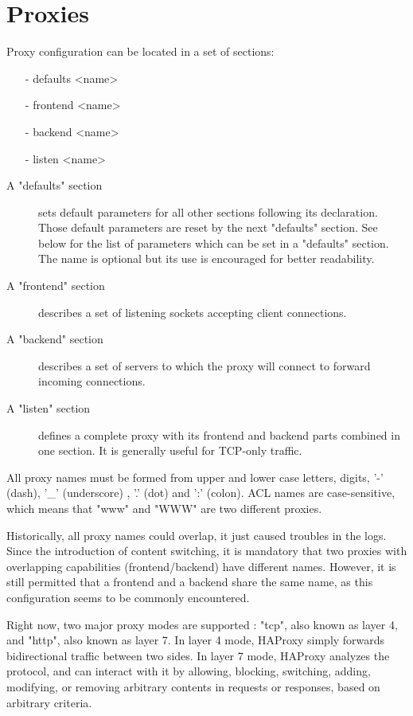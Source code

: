 \chapter{Proxies}

Proxy configuration can be located in a set of sections:
\begin{itemize}
\item[-] defaults <name>
\item[-] frontend <name>
\item[-] backend  <name>
\item[-] listen   <name>
\end{itemize}

\begin{description}
\item[A "defaults" section] sets default parameters for all other sections following
its declaration. Those default parameters are reset by the next "defaults"
section. See below for the list of parameters which can be set in a "defaults"
section. The name is optional but its use is encouraged for better readability.

\item[A "frontend" section] describes a set of listening sockets accepting client
connections.

\item[A "backend" section] describes a set of servers to which the proxy will connect
to forward incoming connections.

\item[A "listen" section] defines a complete proxy with its frontend and backend
parts combined in one section. It is generally useful for TCP-only traffic.
\end{description}

All proxy names must be formed from upper and lower case letters, digits,
'-' (dash), '\_' (underscore) , '.' (dot) and ':' (colon). ACL names are
case-sensitive, which means that "www" and "WWW" are two different proxies.

Historically, all proxy names could overlap, it just caused troubles in the
logs. Since the introduction of content switching, it is mandatory that two
proxies with overlapping capabilities (frontend/backend) have different names.
However, it is still permitted that a frontend and a backend share the same
name, as this configuration seems to be commonly encountered.

Right now, two major proxy modes are supported : "tcp", also known as layer 4,
and "http", also known as layer 7. In layer 4 mode, HAProxy simply forwards
bidirectional traffic between two sides. In layer 7 mode, HAProxy analyzes the
protocol, and can interact with it by allowing, blocking, switching, adding,
modifying, or removing arbitrary contents in requests or responses, based on
arbitrary criteria.

